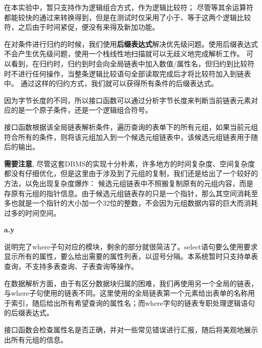 \documentclass{article}
\begin{document}
\begin{spacing}{2}
            在本实验中，暂只支持作为逻辑组合方式，作为逻辑比较符；
            尽管等其余运算符都能较快的通过来转换得到，但是在测试时仅采用了小于、等于这两个逻辑比较符，之后由于时间紧促，便没有来得及新加功能。

            在对条件进行归约的时候，我们使用\textbf{后缀表达式}解决优先级问题。使用后缀表达式不会产生优先级问题，使用一个栈线性地扫描就可以无歧义地完成解析工作。
            可以看到，在归约时，归约到时会向全局链表中加入数值/属性名，但归约到比较符时不进行任何操作，当整条逻辑比较语句全部读取完成后才将比较符加入到链表中。
            通过这样的归约方式，我们就可以获得所有条件的后缀表达式。

            因为字节长度的不同，所以接口函数可以通过分析字节长度来判断当前链表元素对应的是一个原子条件，还是一个逻辑组合符号。

            接口函数根据该全局链表解析条件，遍历查询的表单下的所有元组，如果当前元组符合所有的条件，则将该元组加入到一个候选元组链表中，该候选元组链表用于随后的输出。

            \textbf{需要注意}, 尽管这套DBMS的实现十分朴素，许多地方的时间复杂度、空间复杂度都没有仔细优化，但是这里由于涉及到了元组的复制，我们还是给出了一个较好的方法，以免出现复杂度爆炸：
                候选元组链表中不照搬复制原有的元组内容，而是存原有元组的指针信息。由于候选元组链表存的只是一个指针，那么其空间消耗至多也就是一个指针的大小加一个32位的整数，不会因为元组数据内容的巨大而消耗过多的时间空间。

            \textbf{a.y}
            \begin{spacing}{1.15}
            
            \end{spacing}

            说明完了where子句对应的模块，剩余的部分就很简洁了。select语句要么使用要求显示所有的属性，要么给出需要的属性列表，以逗号分隔。本系统暂时只支持单表查询，不支持多表查询、子表查询等操作。

            在数据解析方面，由于有区分数据块归属的困难，我们再使用另一个全局的链表，与where子句使用的链表不同。这里使用的全局链表第一个元素给出表单的名称用于索引，随后给出所有希望查询的属性名；而where字句的链表专职处理逻辑语句的后缀表达式。

            接口函数会检查属性名是否正确，并对一些常见错误进行汇报，随后将美观地展示出所有元组的信息。


\end{spacing}
\end{document}
